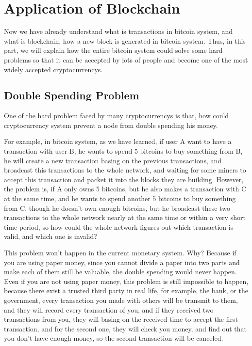\documentclass[12pt,a4paper]{article}
\begin{document}
\section{Application of Blockchain}

Now we have already understand what is transactions in bitcoin system, and what is blockchain, how a new block is generated in bitcoin system. Thus, in this part, we will explain how the entire bitcoin system could solve some hard problems so that it can be accepted by lots of people and become one of the most widely accepted cryptocurrencys.

\subsection{Double Spending Problem}
One of the hard problem faced by many cryptocurrencys is that, how could cryptocurrency system
 prevent a node from double spending his money.
 
 For example, in bitcoin system, as we have learned, if user A want to have a transaction with user B, he wants to spend 5 bitcoins to buy something from B, he will create a new transaction basing on the previous transactions, and broadcast this transactions to the whole network, and waiting for some miners to accept this transaction and packet it into the blocks they are building. However, the problem is, if A only owns 5 bitcoins, but he also makes a transaction with C at the same time, and he wants to spend another 5 bitcoins to buy something from C, though he doesn't own enough bitcoins, but he broadcast these two transactions to the whole network nearly at the same time or within a very short time period, so how could the whole network figures out which transaction is valid, and which one is invalid? 
 
 This problem won't happen in the current monetary system. Why? Because if you are using paper money, since you cannot divide a paper into two parts and make each of them still be valuable, the double spending would never happen. Even if you are not using paper money, this problem is still impossible to happen, because there exist a trusted third party in real life, for example, the bank, or the government, every transaction you made with others will be transmit to them, and they will record every transaction of you, and if they received two transactions from you, they will basing on the received time to accept the first transaction, and for the second one, they will check you money, and find out that you don't have enough money, so the second transaction will be canceled.
 
\end{document}
